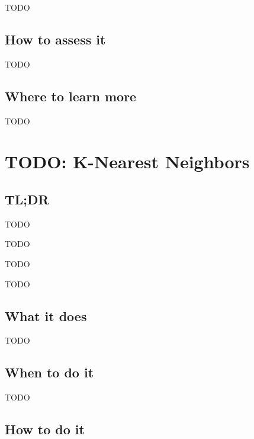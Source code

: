 \documentclass[
]{book}
\providecommand{\tightlist}{%
  \setlength{\itemsep}{0pt}\setlength{\parskip}{0pt}}
\begin{document}
TODO

\hypertarget{how-to-assess-it-6}{%
\section{How to assess it}\label{how-to-assess-it-6}}

TODO

\hypertarget{where-to-learn-more-6}{%
\section{Where to learn more}\label{where-to-learn-more-6}}

TODO

\hypertarget{k-nearest-neighbors}{%
\chapter{TODO: K-Nearest Neighbors}\label{k-nearest-neighbors}}

\hypertarget{tldr-7}{%
\section{TL;DR}\label{tldr-7}}

\begin{description}
\tightlist
\item[What it does]
TODO
\item[When to do it]
TODO
\item[How to do it]
TODO
\item[How to assess it]
TODO
\end{description}

\hypertarget{what-it-does-7}{%
\section{What it does}\label{what-it-does-7}}

TODO

\hypertarget{when-to-do-it-7}{%
\section{When to do it}\label{when-to-do-it-7}}

TODO

\hypertarget{how-to-do-it-7}{%
\section{How to do it}\label{how-to-do-it-7}}
\end{document}
